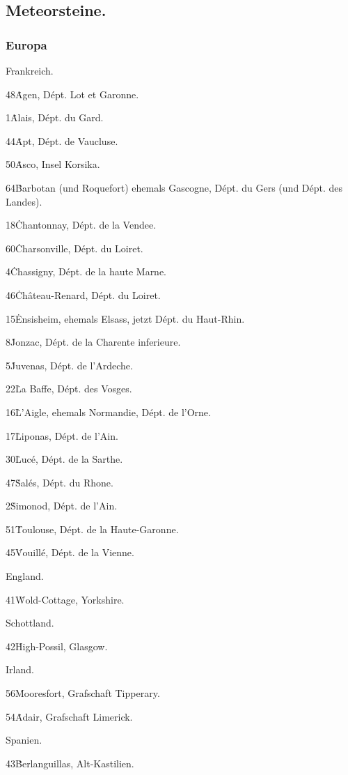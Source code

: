 \documentclass[a4paper, 11pt, oneside, polutonikogreek, german]{article}
\begin{document}
\subsection{Meteorsteine.}
\subsubsection{Europa}
\begin{center}
Frankreich.
\end{center}
48\. Agen, Dépt. Lot et Garonne.

1\. Alais, Dépt. du Gard.

44\. Apt, Dépt. de Vaucluse.

50\. Asco, Insel Korsika.

64\. Barbotan (und Roquefort) ehemals Gascogne, Dépt. du Gers (und Dépt. des Landes).

18\. Chantonnay, Dépt. de la Vendee.

60\. Charsonville, Dépt. du Loiret.

4\. Chassigny, Dépt. de la haute Marne.

46\. Château-Renard, Dépt. du Loiret.

15\. Ensisheim, ehemals Elsass, jetzt Dépt. du Haut-Rhin.

8\. Jonzac, Dépt. de la Charente inferieure.

5\. Juvenas, Dépt. de l'Ardeche.

22\. La Baffe, Dépt. des Vosges.

16\. L'Aigle, ehemals Normandie, Dépt. de l'Orne.

17\. Liponas, Dépt. de l'Ain.

30\. Lucé, Dépt. de la Sarthe.

47\. Salés, Dépt. du Rhone.

2\. Simonod, Dépt. de l'Ain.

51\. Toulouse, Dépt. de la Haute-Garonne.

45\. Vouillé, Dépt. de la Vienne.

England.

41\. Wold-Cottage, Yorkshire.

Schottland.

42\. High-Possil, Glasgow.

Irland.

56\. Mooresfort, Grafschaft Tipperary.

54\. Adair, Grafschaft Limerick.

Spanien.

43\. Berlanguillas, Alt-Kastilien.
\end{document}
